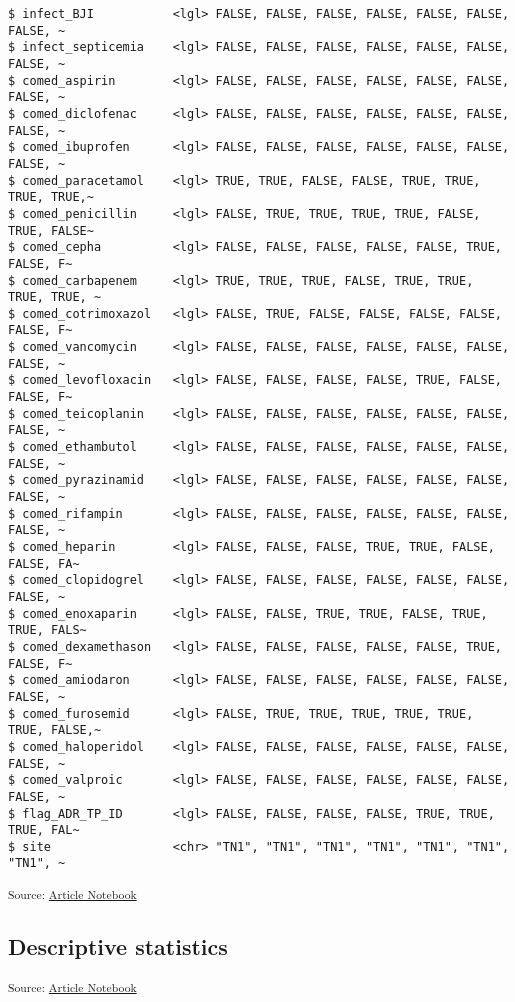 \documentclass[
  letterpaper,
  DIV=11,
  numbers=noendperiod]{scrartcl}
\begin{document}
\begin{verbatim}
$ infect_BJI           <lgl> FALSE, FALSE, FALSE, FALSE, FALSE, FALSE, FALSE, ~
$ infect_septicemia    <lgl> FALSE, FALSE, FALSE, FALSE, FALSE, FALSE, FALSE, ~
$ comed_aspirin        <lgl> FALSE, FALSE, FALSE, FALSE, FALSE, FALSE, FALSE, ~
$ comed_diclofenac     <lgl> FALSE, FALSE, FALSE, FALSE, FALSE, FALSE, FALSE, ~
$ comed_ibuprofen      <lgl> FALSE, FALSE, FALSE, FALSE, FALSE, FALSE, FALSE, ~
$ comed_paracetamol    <lgl> TRUE, TRUE, FALSE, FALSE, TRUE, TRUE, TRUE, TRUE,~
$ comed_penicillin     <lgl> FALSE, TRUE, TRUE, TRUE, TRUE, FALSE, TRUE, FALSE~
$ comed_cepha          <lgl> FALSE, FALSE, FALSE, FALSE, FALSE, TRUE, FALSE, F~
$ comed_carbapenem     <lgl> TRUE, TRUE, TRUE, FALSE, TRUE, TRUE, TRUE, TRUE, ~
$ comed_cotrimoxazol   <lgl> FALSE, TRUE, FALSE, FALSE, FALSE, FALSE, FALSE, F~
$ comed_vancomycin     <lgl> FALSE, FALSE, FALSE, FALSE, FALSE, FALSE, FALSE, ~
$ comed_levofloxacin   <lgl> FALSE, FALSE, FALSE, FALSE, TRUE, FALSE, FALSE, F~
$ comed_teicoplanin    <lgl> FALSE, FALSE, FALSE, FALSE, FALSE, FALSE, FALSE, ~
$ comed_ethambutol     <lgl> FALSE, FALSE, FALSE, FALSE, FALSE, FALSE, FALSE, ~
$ comed_pyrazinamid    <lgl> FALSE, FALSE, FALSE, FALSE, FALSE, FALSE, FALSE, ~
$ comed_rifampin       <lgl> FALSE, FALSE, FALSE, FALSE, FALSE, FALSE, FALSE, ~
$ comed_heparin        <lgl> FALSE, FALSE, FALSE, TRUE, TRUE, FALSE, FALSE, FA~
$ comed_clopidogrel    <lgl> FALSE, FALSE, FALSE, FALSE, FALSE, FALSE, FALSE, ~
$ comed_enoxaparin     <lgl> FALSE, FALSE, TRUE, TRUE, FALSE, TRUE, TRUE, FALS~
$ comed_dexamethason   <lgl> FALSE, FALSE, FALSE, FALSE, FALSE, TRUE, FALSE, F~
$ comed_amiodaron      <lgl> FALSE, FALSE, FALSE, FALSE, FALSE, FALSE, FALSE, ~
$ comed_furosemid      <lgl> FALSE, TRUE, TRUE, TRUE, TRUE, TRUE, TRUE, FALSE,~
$ comed_haloperidol    <lgl> FALSE, FALSE, FALSE, FALSE, FALSE, FALSE, FALSE, ~
$ comed_valproic       <lgl> FALSE, FALSE, FALSE, FALSE, FALSE, FALSE, FALSE, ~
$ flag_ADR_TP_ID       <lgl> FALSE, FALSE, FALSE, FALSE, TRUE, TRUE, TRUE, FAL~
$ site                 <chr> "TN1", "TN1", "TN1", "TN1", "TN1", "TN1", "TN1", ~
\end{verbatim}

\textsubscript{Source:
\href{https://AnTangQuoc.github.io/LZD-TP-pred-model/index.qmd.html}{Article
Notebook}}

\subsection{Descriptive statistics}\label{descriptive-statistics}

\textsubscript{Source:
\href{https://AnTangQuoc.github.io/LZD-TP-pred-model/index.qmd.html}{Article
Notebook}}
\end{document}
